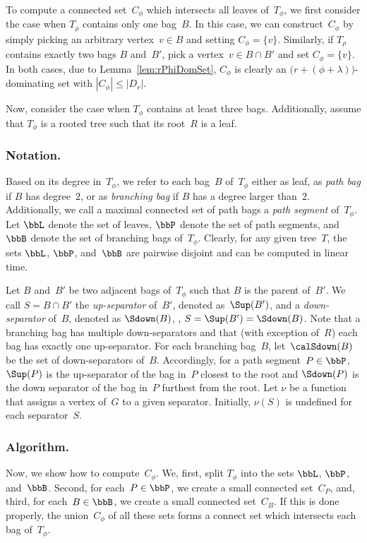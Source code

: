 To compute a connected set~$C_\phi$ which intersects all leaves of~$T_\phi$, we first consider the case when $T_\rho$ contains only one bag~$B$.
In this case, we can construct~$C_\phi$ by simply picking an arbitrary vertex~$v \in B$ and setting $C_\phi = \{ v \}$.
Similarly, if $T_\rho$ contains exactly two bags $B$ and~$B'$, pick a vertex~$v \in B \cap B'$ and set $C_\phi = \{ v \}$.
In both cases, due to Lemma~\ref{lem:rPhiDomSet}, $C_\phi$ is clearly an $\big( r + (\phi + \lambda) \big)$-dominating set with $|C_\phi| \leq |D_r|$.

Now, consider the case when $T_\phi$ contains at least three bags.
Additionally, assume that $T_\phi$ is a rooted tree such that its root~$R$ is a leaf.

\subsubsection{Notation.}
Based on its degree in~$T_\phi$, we refer to each bag~$B$ of~$T_\phi$ either as leaf, as \emph{path bag} if $B$ has degree~$2$, or as \emph{branching bag} if $B$ has a degree larger than~$2$.
Additionally, we call a maximal connected set of path bags a \emph{path segment} of~$T_\phi$.
Let $\bbL$ denote the set of leaves, $\bbP$ denote the set of path segments, and $\bbB$ denote the set of branching bags of~$T_\phi$.
Clearly, for any given tree~$T$, the sets $\bbL$, $\bbP$, and~$\bbB$ are pairwise disjoint and can be computed in linear time.

Let $B$ and~$B'$ be two adjacent bags of~$T_\phi$ such that $B$ is the parent of~$B'$.
We call $S = B \cap B'$ the \emph{up-separator} of~$B'$, denoted as~$\Sup(B')$, and a \emph{down-separator} of~$B$, denoted as $\Sdown(B)$, \ie, $S = \Sup(B') = \Sdown(B)$.
Note that a branching bag has multiple down-separators and that (with exception of~$R$) each bag has exactly one up-separator.
For each branching bag~$B$, let~$\calSdown(B)$ be the set of down-separators of~$B$.
Accordingly, for a path segment~$P \in \bbP$, $\Sup(P)$ is the up-separator of the bag in~$P$ closest to the root and $\Sdown(P)$ is the down separator of the bag in~$P$ furthest from the root.
Let $\nu$ be a function that assigns a vertex of~$G$ to a given separator.
Initially, $\nu(S)$ is undefined for each separator~$S$.


\subsubsection{Algorithm.}
Now, we show how to compute~$C_\phi$.
We, first, split $T_\phi$ into the sets $\bbL$, $\bbP$, and~$\bbB$.
Second, for each~$P \in \bbP$, we create a small connected set~$C_P$, and, third, for each~$B \in \bbB$, we create a small connected set~$C_B$.
If this is done properly, the union~$C_\phi$ of all these sets forms a connect set which intersects each bag of~$T_\phi$.

